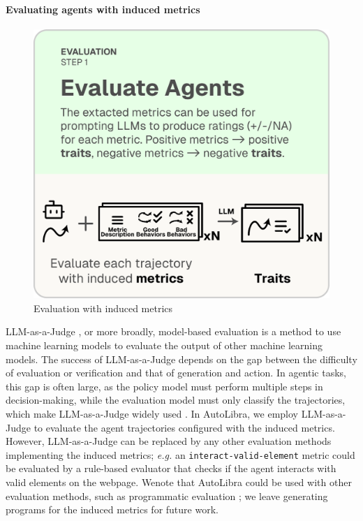 \paragraph{Evaluating agents with induced metrics}
\begin{figure}
    \vspace{-23pt}
	\includegraphics[width=\linewidth]{figs/autolibra_step_3.pdf}
	\vspace{-15pt}
	\caption{Evaluation with induced metrics}
	\label{fig:llm_as_a_judge}
\end{figure}
LLM-as-a-Judge \citep{zheng2023judging}, or more broadly, model-based evaluation
\citep{zhang2019bertscore,celikyilmaz2021evaluationtextgenerationsurvey} is a
method to use machine learning models to evaluate the output of other machine
learning models. The success of LLM-as-a-Judge depends on the gap between the difficulty
of evaluation or verification and that of generation and action. In agentic
tasks, this gap is often large, as the policy model must perform multiple steps
in decision-making, while the evaluation model must only classify the trajectories,
which make LLM-as-a-Judge widely used \citep{zhouwebarena,he2024webvoyager,zhousotopia}.
In AutoLibra, we employ LLM-as-a-Judge to evaluate the agent trajectories configured
with the induced metrics. However, LLM-as-a-Judge can be replaced by any other evaluation
methods implementing the induced metrics; \emph{e.g.} an \texttt{interact-valid-element}
metric could be evaluated by a rule-based evaluator that checks if the agent
interacts with valid elements on the webpage. Wenote that AutoLibra could be used
with other evaluation methods, such as programmatic evaluation \citep{maeureka};
we leave generating programs for the induced metrics for future work.


